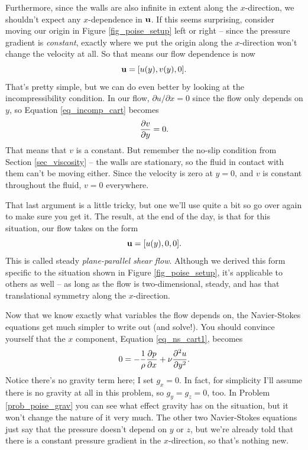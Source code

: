 Furthermore, since the walls are also infinite in extent along the $x$-direction, we shouldn't expect any $x$-dependence in $\mathbf{u}$.  If this seems surprising, consider moving our origin in Figure \ref{fig_poise_setup} left or right -- since the pressure gradient is \emph{constant}, exactly where we put the origin along the $x$-direction won't change the velocity at all.  So that means our flow dependence is now
\[
\mathbf{u} = [u(y), v(y), 0].
\]
That's pretty simple, but we can do even better by looking at the incompressibility condition.  In our flow, $\partial u /\partial x = 0$ since the flow only depends on $y$, so Equation \ref{eq_incomp_cart} becomes
\[
\frac{\partial {v}}{\partial {y}} = 0.
\]
That means that $v$ is a constant.  But remember the no-slip condition from Section \ref{sec_viscosity} -- the walls are stationary, so the fluid in contact with them can't be moving either.  Since the velocity is zero at $y=0$, and $v$ is constant throughout the fluid, $v=0$ everywhere.

That last argument is a little tricky, but one we'll use quite a bit so go over again to make sure you get it.  The result, at the end of the day, is that for this situation, our flow takes on the form
\begin{equation}
\mathbf{u} = [u(y), 0, 0].
\end{equation}
This is called steady \emph{plane-parallel shear flow}.  Although we derived this form specific to the situation shown in Figure \ref{fig_poise_setup}, it's applicable to others as well -- as long as the flow is two-dimensional, steady, and has that translational symmetry along the $x$-direction.

Now that we know exactly what variables the flow depends on, the Navier-Stokes equations get much simpler to write out (and solve!).  You should convince yourself that the $x$ component, Equation \ref{eq_ns_cart1}, becomes
\begin{equation}
\label{eq_poise_diffeq}
0 = -\frac{1}{\rho} \frac{\partial {p}}{\partial {x}} + \nu \frac{\partial^2 {u}}{\partial {y}^2}.
\end{equation}
Notice there's no gravity term here; I set $g_x = 0$. In fact, for simplicity I'll assume there is no gravity at all in this problem, so $g_y = g_z = 0$, too.  In Problem \ref{prob_poise_grav} you can see what effect gravity has on the situation, but it won't change the nature of it very much.  The other two Navier-Stokes equations just say that the pressure doesn't depend on $y$ or $z$, but we're already told that there is a constant pressure gradient in the $x$-direction, so that's nothing new.


